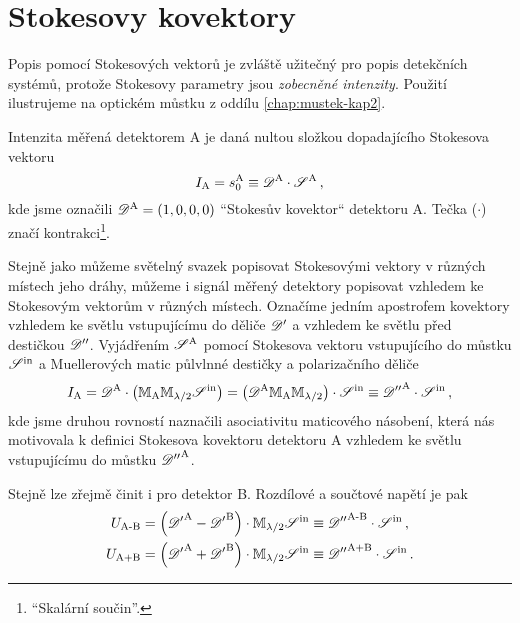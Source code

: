 \section{Stokesovy kovektory}
\label{app:kovektory}


Popis pomocí Stokesových vektorů je zvláště užitečný pro popis detekčních systémů, protože Stokesovy parametry jsou \emph{zobecněné intenzity}.
Použití ilustrujeme na optickém můstku z oddílu \ref{chap:mustek-kap2}.

Intenzita měřená detektorem A je daná nultou složkou dopadajícího Stokesova vektoru
\begin{equation}
    I_\textrm{A}=s_0^\textrm{A} \equiv \mathscr{D}^\textrm{A} \cdot \mathscr{S}^\textrm{A} \,,
\end{equation}
kde jsme označili $\mathscr{D}^\textrm{A}=(1, 0, 0, 0)$ ``Stokesův kovektor`` detektoru A. 
Tečka ($\cdot$) značí kontrakci\footnote{``Skalární součin''.}.

Stejně jako můžeme světelný svazek popisovat Stokesovými vektory v různých místech jeho dráhy, můžeme i signál měřený detektory popisovat vzhledem ke Stokesovým vektorům v různých místech.
Označíme jedním apostrofem kovektory vzhledem ke světlu vstupujícímu do děliče $\mathscr{D}'$ a vzhledem ke světlu před destičkou $\mathscr{D}''$.
Vyjádřením $\mathscr{S}^\textrm{A}$ pomocí Stokesova vektoru vstupujícího do můstku $\mathscr{S}^\textrm{in}$ a Muellerových matic půlvlnné destičky a polarizačního děliče 
\begin{equation}
    I_\textrm{A}= \mathscr{D}^\textrm{A} \cdot \left( \mathbb{M}_\textrm{A} \mathbb{M}_{\lambda/2} \mathscr{S}^\textrm{in} \right) = \left( \mathscr{D}^\textrm{A} \mathbb{M}_\textrm{A} \mathbb{M}_{\lambda/2}\right) \cdot \mathscr{S}^\textrm{in} \equiv {\mathscr{D}''}^\textrm{A} \cdot \mathscr{S}^\textrm{in}  \,,
\end{equation}
kde jsme druhou rovností naznačili asociativitu maticového násobení, která nás motivovala k definici Stokesova kovektoru detektoru A vzhledem ke světlu vstupujícímu do můstku ${\mathscr{D}''}^\textrm{A}$.

Stejně lze zřejmě činit i pro detektor B.
Rozdílové a součtové napětí je pak
\begin{subequations}
\label{eqn:af}
\begin{align}
    U_\textrm{A-B} &= \left( {\mathscr{D}'}^\textrm{A}-{\mathscr{D}'}^\textrm{B}\right) \cdot \mathbb{M}_{\lambda/2} \mathscr{S}^\textrm{in} \equiv {\mathscr{D}''}^\textrm{A-B}\cdot \mathscr{S}^\textrm{in} \,, \\
    U_\textrm{A+B} &= \left({\mathscr{D}'}^\textrm{A}+{\mathscr{D}'}^\textrm{B}\right) \cdot \mathbb{M}_{\lambda/2}\mathscr{S}^\textrm{in} \equiv {\mathscr{D}''}^\textrm{A+B}\cdot \mathscr{S}^\textrm{in} \,.
\end{align}
\end{subequations}

